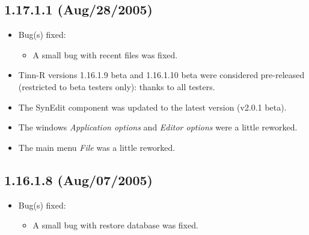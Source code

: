 \subsection*{1.17.1.1 (Aug/28/2005)}
\begin{itemize}
  \item Bug(s) fixed:
    \begin{itemize}
      \item A small bug with recent files was fixed.
    \end{itemize}
  \item Tinn-R versions 1.16.1.9 beta and 1.16.1.10 beta were considered
    pre-released (restricted to beta testers only): thanks to all testers.
  \item The SynEdit component was updated to the latest version (v2.0.1 beta).
  \item The windows \textit{Application options} and \textit{Editor options}
    were a little reworked.
  \item The main menu \textit{File} was a little reworked.
\end{itemize}


\subsection*{1.16.1.8 (Aug/07/2005)}
\begin{itemize}
  \item Bug(s) fixed:
    \begin{itemize}
      \item A small bug with restore database was fixed.
    \end{itemize}
\end{itemize}


